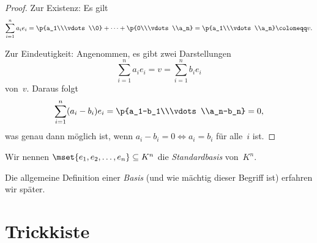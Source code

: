 \documentclass[a4paper]{article}
\begin{document}
\begin{proof}
    Zur Existenz: Es gilt
    \begin{equation*}
        \sum_{i=1}^n a_ie_i = \p{a_1\\\vdots\\0} + \dots + \p{0\\\vdots\\a_n} = \p{a_1\\\vdots\\a_n} \coloneqq v.
    \end{equation*}

    Zur Eindeutigkeit: Angenommen, es gibt zwei Darstellungen
    \begin{equation*}
        \sum_{i=1}^n a_ie_i = v = \sum_{i=1}^n b_ie_i
    \end{equation*}
    von~$v$. Daraus folgt
    \begin{equation*}
        \sum_{i=1}^n (a_i-b_i)e_i = \p{a_1-b_1\\\vdots\\a_n-b_n} = 0,
    \end{equation*}
    was genau dann möglich ist, wenn $a_i-b_i = 0 \iff a_i = b_i$ für alle~$i$ ist.
\end{proof}

\begin{definition}[Standardbasis]
    Wir nennen $\mset{e_1,e_2,\dots,e_n} \subseteq K^n$ die \emph{Standardbasis} von~$K^n$.
\end{definition}

Die allgemeine Definition einer \emph{Basis} (und wie mächtig dieser Begriff ist) erfahren wir später.



\newpage\appendix

\section{Trickkiste}
\end{document}
